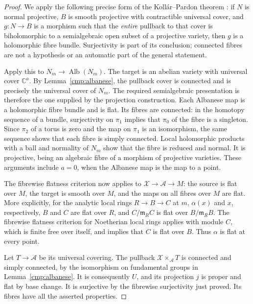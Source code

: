 \begin{proof}
We apply the following precise form of the Koll\'ar--Pardon theorem
\cite[arXiv version~2, Theorem~20]{KollarPardon2012}: if $N$ is normal projective, $B$
is smooth projective with contractible universal cover, and
$g:N\to B$ is a morphism such that the \emph{entire} pullback to that
cover is biholomorphic to a semialgebraic open subset of a projective
variety, then $g$ is a holomorphic fibre bundle.  Surjectivity is part
of its conclusion; connected fibres are not a hypothesis or an
automatic part of the general statement.

Apply this to $N_m\to\operatorname{Alb}(N_m)$.  The target is an
abelian variety with universal cover $\mathbb C^a$.  By
Lemma~\ref{cmp:albanese}, the pullback cover is connected and is
precisely the universal cover of $N_m$.  The required semialgebraic
presentation is therefore the one supplied by the projection
construction.  Each Albanese map is a holomorphic fibre bundle and
is flat.  Its fibres are connected: in the homotopy sequence of a
bundle, surjectivity on $\pi_1$ implies that $\pi_0$ of the fibre is
a singleton.  Since $\pi_2$ of a torus is zero and the map on $\pi_1$
is an isomorphism, the same sequence shows that each fibre is simply
connected.  Local holomorphic products with a ball and normality of
$N_m$ show that the fibre is reduced and normal.  It is projective,
being an algebraic fibre of a morphism of projective varieties.  These
arguments include $a=0$, when the Albanese map is the map to a point.

The fibrewise flatness criterion now applies to
$\mathcal X\to\mathcal A\to M$: the source is flat over $M$, the
target is smooth over $M$, and the maps on all fibres over $M$ are
flat.  More explicitly, for the analytic local rings $R\to B\to C$
at $m$, $\alpha(x)$ and $x$, respectively, $B$ and $C$ are flat over
$R$, and $C/\mathfrak m_R C$ is flat over
$B/\mathfrak m_R B$.  The fibrewise flatness criterion for Noetherian local rings
\cite[Tag~00MP]{StacksProject} applies with module $C$, which is
finite free over itself, and implies that $C$ is flat over $B$.  Thus $\alpha$ is flat
at every point.

Let $T\to\mathcal A$ be its universal covering.  The pullback
$\mathcal X\times_{\mathcal A}T$ is connected and simply connected,
by the isomorphism on fundamental groups in Lemma~\ref{cmp:albanese}.
It is consequently $U$, and its projection $j$ is proper and flat by
base change.  It is surjective by the fibrewise surjectivity just
proved.  Its fibres have all the asserted properties.


\end{proof}
